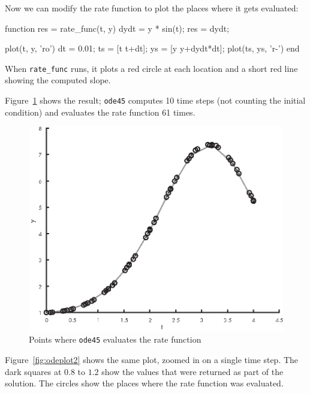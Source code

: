 
Now we can modify the rate function to plot the places where it gets evaluated:

\begin{code}
function res = rate_func(t, y)
    dydt = y * sin(t);
    res = dydt;

    plot(t, y, 'ro')
    dt = 0.01;
    ts = [t t+dt];
    ys = [y y+dydt*dt];
    plot(ts, ys, 'r-')
end
\end{code}

When \lstinline{rate_func} runs, it plots a red circle at each location and a short red line showing the computed slope.


Figure~\ref{fig:odeplot1} shows the result;  \lstinline{ode45} computes 10 time steps (not counting the initial condition) and evaluates the rate function 61 times.

\begin{figure}[h]
\includegraphics{images/figure15_01_new.eps}
\caption{Points where \lstinline{ode45} evaluates the rate function}
\label{fig:odeplot1}
\end{figure}

Figure~\ref{fig:odeplot2} shows the same plot, zoomed in on a single time step.
The dark squares at $0.8$ to $1.2$ show the values that were returned as part of the solution.
The circles show the places where the rate function was evaluated.

